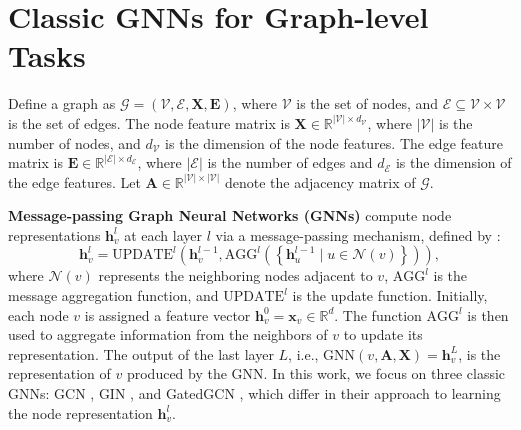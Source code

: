 \section{Classic GNNs for Graph-level Tasks}
\label{sec:pre}

Define a graph as \( \mathcal{G} = (\mathcal{V}, \mathcal{E}, \boldsymbol{X}, \boldsymbol{E}) \), where \(\mathcal{V} \) is the set of nodes, and \( \mathcal{E} \subseteq \mathcal{V} \times \mathcal{V} \) is the set of edges. The node feature matrix is \( \boldsymbol{X} \in \mathbb{R}^{|\mathcal{V}| \times d_\mathcal{V}} \),  where \( |\mathcal{V}| \) is the number of nodes, and \( d_\mathcal{V} \) is the dimension of the node features. The edge feature matrix is \( \boldsymbol{E} \in \mathbb{R}^{|\mathcal{E}| \times d_\mathcal{E}} \),  where \( |\mathcal{E}| \) is the number of edges and \( d_\mathcal{E} \) is the dimension of the edge features. Let \( \boldsymbol{A} \in \mathbb{R}^{|\mathcal{V}| \times |\mathcal{V}|} \) denote the adjacency matrix of $\mathcal{G}$.



\textbf{Message-passing Graph Neural Networks (GNNs)} compute node representations $\boldsymbol{h}_{v}^{l}$ at each layer $l$ via a message-passing mechanism, defined by \citet{gilmer2017neural}: 
\begin{equation}	\boldsymbol{h}_{v}^{l}=\text{UPDATE}^{l}\left( \boldsymbol{h}_{v}^{l -1},\text{AGG}^{l}\left( \left\{ \boldsymbol{h}_{u}^{l-1}\mid u\in \mathcal{N}\left( v \right) \right\} \right) \right),
 \label{eq1}
\end{equation} 
where \(\mathcal{N}(v)\) represents the neighboring nodes adjacent to \(v\), \(\text{AGG}^{l}\) is the message aggregation function, and $\text{UPDATE}^{l}$ is the update function.
Initially, each node \(v\) is assigned a feature vector \(\boldsymbol{h}_{v}^{0} = \boldsymbol{x}_v \in \mathbb{R}^d\).
The function $\text{AGG}^{l}$ is then used to aggregate information from the neighbors of $v$ to update its representation. 
The output of the last layer $L$, i.e., \(\text{GNN}(v, \boldsymbol{A}, \boldsymbol{X}) = \boldsymbol{h}_{v}^{L}\), is the representation of $v$ produced by the GNN. In this work, we focus on three classic GNNs: GCN \cite{kipf2017semisupervised}, GIN \cite{xu2018powerful}, and GatedGCN \cite{bresson2017residual}, which differ in their approach to learning the node representation $\boldsymbol{h}_{v}^{l}$. 

